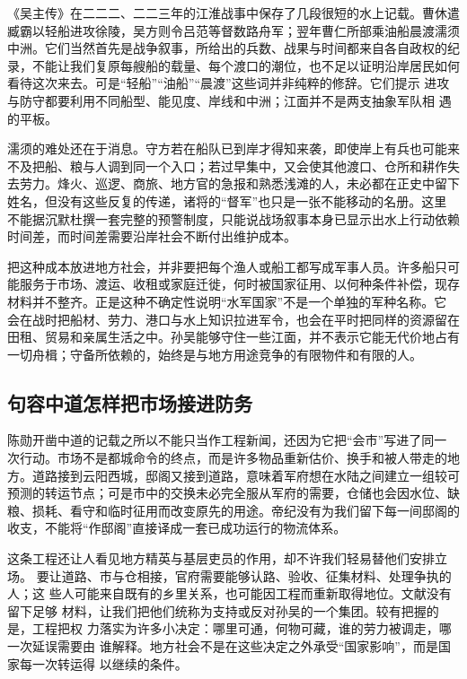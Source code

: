 《吴主传》在二二二、二二三年的江淮战事中保存了几段很短的水上记载。曹休遣
臧霸以轻船进攻徐陵，吴方则令吕范等督数路舟军；翌年曹仁所部乘油船晨渡濡须
中洲。它们当然首先是战争叙事，所给出的兵数、战果与时间都来自各自政权的纪
录，不能让我们复原每艘船的载量、每个渡口的潮位，也不足以证明沿岸居民如何
看待这次来去。可是“轻船”“油船”“晨渡”这些词并非纯粹的修辞。它们提示
进攻与防守都要利用不同船型、能见度、岸线和中洲；江面并不是两支抽象军队相
遇的平板。

濡须的难处还在于消息。守方若在船队已到岸才得知来袭，即使岸上有兵也可能来
不及把船、粮与人调到同一个入口；若过早集中，又会使其他渡口、仓所和耕作失
去劳力。烽火、巡逻、商旅、地方官的急报和熟悉浅滩的人，未必都在正史中留下
姓名，但没有这些反复的传递，诸将的“督军”也只是一张不能移动的名册。这里
不能据沉默杜撰一套完整的预警制度，只能说战场叙事本身已显示出水上行动依赖
时间差，而时间差需要沿岸社会不断付出维护成本。

把这种成本放进地方社会，并非要把每个渔人或船工都写成军事人员。许多船只可
能服务于市场、渡运、收租或家庭迁徙，何时被国家征用、以何种条件补偿，现存
材料并不整齐。正是这种不确定性说明“水军国家”不是一个单独的军种名称。它
会在战时把船材、劳力、港口与水上知识拉进军令，也会在平时把同样的资源留在
田租、贸易和亲属生活之中。孙吴能够守住一些江面，并不表示它能无代价地占有
一切舟楫；守备所依赖的，始终是与地方用途竞争的有限物件和有限的人。

\subsection{句容中道怎样把市场接进防务}

陈勋开凿中道的记载之所以不能只当作工程新闻，还因为它把“会市”写进了同一
次行动。市场不是都城命令的终点，而是许多物品重新估价、换手和被人带走的地
方。道路接到云阳西城，邸阁又接到道路，意味着军府想在水陆之间建立一组较可
预测的转运节点；可是市中的交换未必完全服从军府的需要，仓储也会因水位、缺
粮、损耗、看守和临时征用而改变原先的用途。帝纪没有为我们留下每一间邸阁的
收支，不能将“作邸阁”直接译成一套已成功运行的物流体系。

这条工程还让人看见地方精英与基层吏员的作用，却不许我们轻易替他们安排立场。
要让道路、市与仓相接，官府需要能够认路、验收、征集材料、处理争执的人；这
些人可能来自既有的乡里关系，也可能因工程而重新取得地位。文献没有留下足够
材料，让我们把他们统称为支持或反对孙吴的一个集团。较有把握的是，工程把权
力落实为许多小决定：哪里可通，何物可藏，谁的劳力被调走，哪一次延误需要由
谁解释。地方社会不是在这些决定之外承受“国家影响”，而是国家每一次转运得
以继续的条件。

